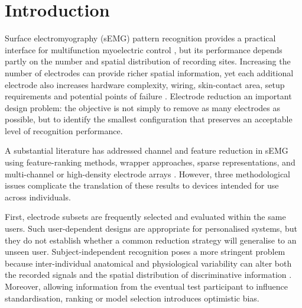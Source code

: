\section{Introduction}
\label{sec:introduction}

Surface electromyography (sEMG) pattern recognition provides a practical interface for multifunction myoelectric control \citep{hudgins1993new,englehart2003robust,scheme2011electromyogram,farina2014extraction}, but its performance depends partly on the number and spatial distribution of recording sites. Increasing the number of electrodes can provide richer spatial information, yet each additional electrode also increases hardware complexity, wiring, skin-contact area, setup requirements and potential points of failure \citep{vujaklija2016new}. Electrode reduction  an important design problem: the objective is not simply to remove as many electrodes as possible, but to identify the smallest configuration that preserves an acceptable level of recognition performance.

A substantial literature has addressed channel and feature reduction in sEMG using feature-ranking methods, wrapper approaches, sparse representations, and multi-channel or high-density electrode arrays \citep{phinyomark2012feature,liu2014emg,altimemy2013classification,stango2015spatial,qu2021reduce}. However, three methodological issues complicate the translation of these results to devices intended for use across individuals.

First, electrode subsets are frequently selected and evaluated within the same users. Such user-dependent designs are appropriate for personalised systems, but they do not establish whether a common reduction strategy will generalise to an unseen user. Subject-independent recognition poses a more stringent problem because inter-individual anatomical and physiological variability can alter both the recorded signals and the spatial distribution of discriminative information \citep{phinyomark2018emg,cote2019deep}. Moreover, allowing information from the eventual test participant to influence standardisation, ranking or model selection introduces optimistic bias.

